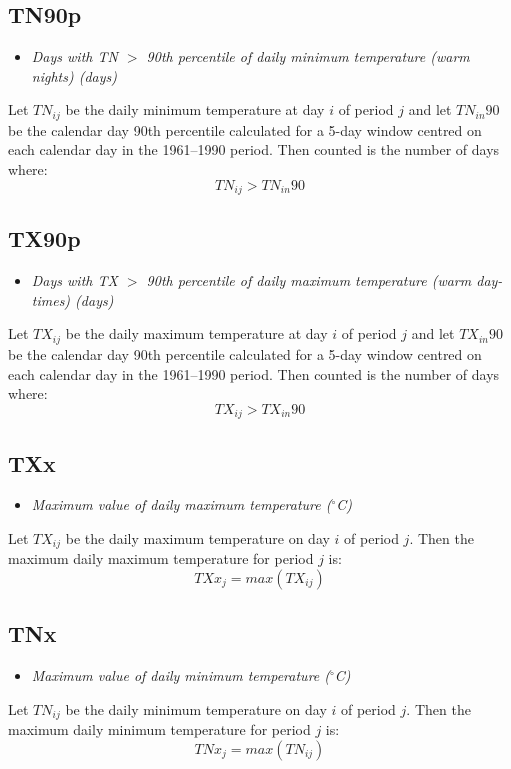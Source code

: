 \documentclass[a4paper,11pt]{article}
\begin{document}
\subsection*{TN90p}
\begin{itemize}
\item \textit{Days with TN $>$ 90th percentile of daily minimum
temperature (warm nights) (days)}
\end{itemize}
Let $TN_{ij}$ be the daily minimum temperature at day $i$ of period
$j$ and let $TN_{in}90$ be the calendar day 90th percentile calculated
for a 5-day window centred on each calendar day in the 1961--1990
period. Then counted is the number of days where:
\begin{equation*}
TN_{ij} > TN_{in}90
\end{equation*}

\subsection*{TX90p}
\begin{itemize}
\item \textit{Days with TX $>$ 90th percentile of daily maximum
temperature (warm day-times) (days)}
\end{itemize}
Let $TX_{ij}$ be the daily maximum temperature at day $i$ of period
$j$ and let $TX_{in}90$ be the calendar day 90th percentile calculated
for a 5-day window centred on each calendar day in the 1961--1990
period. Then counted is the number of days where:
\begin{equation*}
TX_{ij} > TX_{in}90
\end{equation*}

\subsection*{TXx}
\begin{itemize}
\item \textit{Maximum value of daily maximum temperature ($^\circ$C)}
\end{itemize}
Let $TX_{ij}$ be the daily maximum temperature on day $i$ of period
$j$. Then the maximum daily maximum temperature for period $j$ is:
\begin{equation*}
TXx_{j} = max(TX_{ij})
\end{equation*}

\subsection*{TNx}
\begin{itemize}
\item \textit{Maximum value of daily minimum temperature ($^\circ$C)}
\end{itemize}
Let $TN_{ij}$ be the daily minimum temperature on day $i$ of period
$j$. Then the maximum daily minimum temperature for period $j$ is:
\begin{equation*}
TNx_{j} = max(TN_{ij})
\end{equation*}
\end{document}
